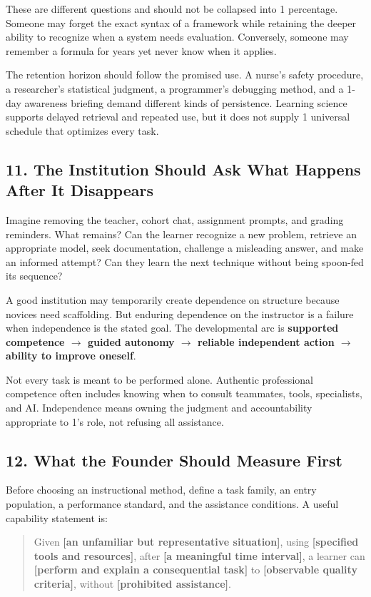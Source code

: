 These are different questions and should not be collapsed into 1 percentage. Someone may forget the exact syntax of a framework while retaining the deeper ability to recognize when a system needs evaluation. Conversely, someone may remember a formula for years yet never know when it applies.

The retention horizon should follow the promised use. A nurse's safety procedure, a researcher's statistical judgment, a programmer's debugging method, and a 1-day awareness briefing demand different kinds of persistence. Learning science supports delayed retrieval and repeated use, but it does not supply 1 universal schedule that optimizes every task.

\subsection*{11. The Institution Should Ask What Happens After It Disappears}

Imagine removing the teacher, cohort chat, assignment prompts, and grading reminders. What remains? Can the learner recognize a new problem, retrieve an appropriate model, seek documentation, challenge a misleading answer, and make an informed attempt? Can they learn the next technique without being spoon-fed its sequence?

A good institution may temporarily create dependence on structure because novices need scaffolding. But enduring dependence on the instructor is a failure when independence is the stated goal. The developmental arc is \textbf{supported competence $\to$ guided autonomy $\to$ reliable independent action $\to$ ability to improve oneself}.

Not every task is meant to be performed alone. Authentic professional competence often includes knowing when to consult teammates, tools, specialists, and AI. Independence means owning the judgment and accountability appropriate to 1's role, not refusing all assistance.

\subsection*{12. What the Founder Should Measure First}

Before choosing an instructional method, define a task family, an entry population, a performance standard, and the assistance conditions. A useful capability statement is:

\begin{quote}
Given \textbf{[an unfamiliar but representative situation]}, using \textbf{[specified tools and resources]}, after \textbf{[a meaningful time interval]}, a learner can \textbf{[perform and explain a consequential task]} to \textbf{[observable quality criteria]}, without \textbf{[prohibited assistance]}.
\end{quote}

